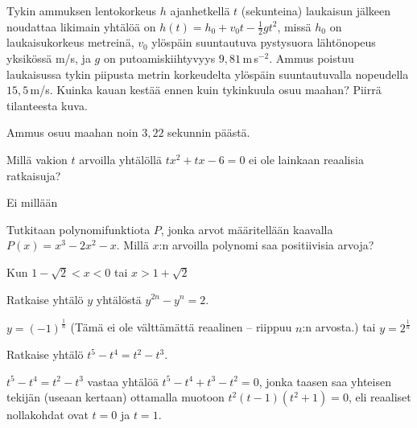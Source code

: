  \begin{tehtava}
Tykin ammuksen lentokorkeus $h$ ajanhetkellä $t$ (sekunteina) laukaisun jälkeen noudattaa likimain yhtälöä on $h(t)=h_0+v_0t-\frac{1}{2}gt^2$, missä $h_0$ on laukaisukorkeus metreinä, $v_0$ ylöspäin suuntautuva pystysuora lähtönopeus yksikössä m/s, ja $g$ on putoamiskiihtyvyys $9,81$\,m\,s$^{-2}$. Ammus poistuu laukaisussa tykin piipusta metrin korkeudelta ylöspäin suuntautuvalla nopeudella $15,5$\,m/s. Kuinka kauan kestää ennen kuin tykinkuula osuu maahan? Piirrä tilanteesta kuva.
	\begin{vastaus}
	Ammus osuu maahan noin $3,22$ sekunnin päästä. %
	\end{vastaus}
\end{tehtava}

\begin{tehtava}
Millä vakion $t$ arvoilla yhtälöllä $tx^2+tx-6=0$ ei ole lainkaan reaalisia ratkaisuja?
	\begin{vastaus}
Ei millään
	\end{vastaus}
\end{tehtava}

\begin{tehtava}
Tutkitaan polynomifunktiota $P$, jonka arvot määritellään kaavalla $P(x)=x^3-2x^2-x$. Millä $x$:n arvoilla polynomi saa positiivisia arvoja?
	\begin{vastaus}
	Kun $1-\sqrt{2}<x<0$ tai $x>1+\sqrt{2}$
	\end{vastaus}
\end{tehtava}

\begin{tehtava}
Ratkaise yhtälö $y$ yhtälöstä $y^{2n}-y^n=2$.
	\begin{vastaus}
$y=(-1)^{\frac{1}{n}}$ (Tämä ei ole välttämättä reaalinen -- riippuu $n$:n arvosta.) tai $y=2^{\frac{1}{n}}$
	\end{vastaus}
\end{tehtava}

\begin{tehtava}
Ratkaise yhtälö $t^5-t^4=t^2-t^3$.
	\begin{vastaus}
$t^5-t^4=t^2-t^3$ vastaa yhtälöä $t^5-t^4+t^3-t^2=0$, jonka taasen saa yhteisen tekijän (useaan kertaan) ottamalla muotoon $t^2(t-1)(t^2+1)=0$, eli reaaliset nollakohdat ovat $t=0$ ja $t=1$.
	\end{vastaus}
\end{tehtava}

